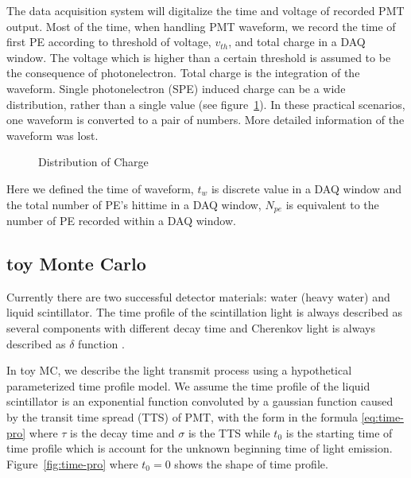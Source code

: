 The data acquisition system will digitalize the time and voltage of recorded PMT output. Most of the time, when handling PMT waveform, we record the time of first PE according to threshold of voltage, $v_{th}$, and total charge in a DAQ window. The voltage which is higher than a certain threshold is assumed to be the consequence of photonelectron. Total charge is the integration of the waveform. Single photonelectron (SPE) induced charge can be a wide distribution, rather than a single value (see figure~\ref{fig:charge}). In these practical scenarios, one waveform is converted to a pair of numbers. More detailed information of the waveform was lost. 

\begin{minipage}[b]{1.\textwidth}
\begin{figure}[H]
    \centering
    \scalebox{0.4}{}
    \caption{\label{fig:charge} Distribution of Charge}
\end{figure}
\end{minipage}

Here we defined the time of waveform, $t_{w}$ is discrete value in a DAQ window and the total number of PE's hittime in a DAQ window, $N_{pe}$ is equivalent to the number of PE recorded within a DAQ window. 

\subsection{toy Monte Carlo}

Currently there are two successful detector materials: water (heavy water) and liquid scintillator. The time profile of the scintillation light is always described as several components with different decay time and Cherenkov light is always described as $\delta$ function \cite{ludhova_particle_2020}. 

In toy MC, we describe the light transmit process using a hypothetical parameterized time profile model. We assume the time profile of the liquid scintillator is an exponential function convoluted by a gaussian function \cite{li_separation_2016} caused by the transit time spread (TTS) of PMT, with the form in the formula \eqref{eq:time-pro} where $\tau$ is the decay time and $\sigma$ is the TTS while $t_{0}$ is the starting time of time profile which is account for the unknown beginning time of light emission. Figure~\ref{fig:time-pro} where $t_{0}=0$ shows the shape of time profile. 

